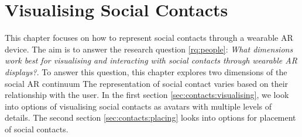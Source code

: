 \chapter{Visualising Social Contacts}
\label{ch:contacts} 

This chapter focuses on how to represent social contacts through a wearable AR device. The aim is to answer the research question \ref{rq:people}: \textit{What dimensions work best for visualising and interacting with social contacts through wearable AR displays?}. To answer this question, this chapter explores two dimensions of the social AR continuum 
The representation of social contact varies based on their relationship with the user. 
In the first section \ref{sec:contacts:visualising}, we look into options of visualising social contacts as avatars with multiple levels of details. The second section \ref{sec:contacts:placing} looks into options for placement of social contacts. 




